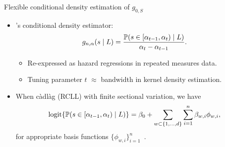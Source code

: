 \documentclass{beamer}
\begin{document}



\begin{frame}[c]{Flexible conditional density estimation of $g_{0,S}$}

\begin{center}
\begin{itemize}
  \itemsep8pt
  \item \cite{diaz2011super}'s conditional density estimator:
    \begin{equation*}
      g_{n, \alpha}(s \mid L) = \frac{\mathbb{P} (s \in [\alpha_{t-1}, \alpha_t)
        \mid L)}{\alpha_t - \alpha_{t-1}}.
    \end{equation*}
    \vspace{-0.5em}
    \begin{itemize}
      \itemsep4pt
      \item Re-expressed as hazard regressions in repeated measures data.
      \item Tuning parameter $t$ $\approx$ bandwidth in kernel density
        estimation.
    \end{itemize}
  \item When c\`{a}dl\`{a}g (RCLL) with finite sectional variation, we have
    {\small{
    \begin{equation*}
     \operatorname{logit} \{\mathbb{P}(s \in [\alpha_{t-1}, \alpha_t) \mid L)\} = \beta_0 +
       \sum_{w \subset\{1,\ldots,d\}} \sum_{i=1}^{n} \beta_{w,i} \phi_{w,i},
    \end{equation*} }
    }
    for appropriate basis functions
    $\{ \phi_{w,i} \}_{i=1}^n$~\citep{gill1995inefficient}.
\end{itemize}
\end{center}

\note{
}

\end{frame}

\end{document}
